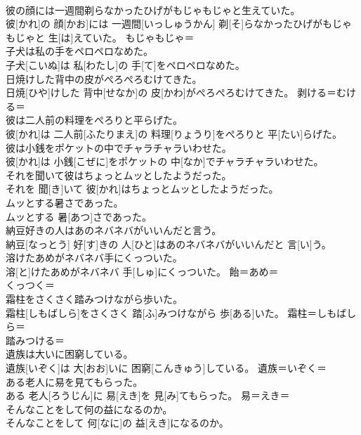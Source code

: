 \documentclass[8pt]{extreport}
\begin{document}
\begin{CJK}{UTF8}{min}
\\	彼の顔には一週間剃らなかったひげがもじゃもじゃと生えていた。	
\\	彼[かれ]の 顔[かお]には 一週間[いっしゅうかん] 剃[そ]らなかったひげがもじゃもじゃと 生[は]えていた。	もじゃもじゃ＝ 
\\	子犬は私の手をペロペロなめた。	
\\	子犬[こいぬ]は 私[わたし]の 手[て]をペロペロなめた。	
\\	日焼けした背中の皮がぺろぺろむけてきた。	
\\	日焼[ひや]けした 背中[せなか]の 皮[かわ]がぺろぺろむけてきた。	剥ける＝むける＝ 
\\	彼は二人前の料理をぺろりと平らげた。	
\\	彼[かれ]は 二人前[ふたりまえ]の 料理[りょうり]をぺろりと 平[たい]らげた。	
\\	彼は小銭をポケットの中でチャラチャラいわせた。	
\\	彼[かれ]は 小銭[こぜに]をポケットの 中[なか]でチャラチャラいわせた。	
\\	それを聞いて彼はちょっとムッとしたようだった。	
\\	それを 聞[き]いて 彼[かれ]はちょっとムッとしたようだった。	
\\	ムッとする暑さであった。	
\\	ムッとする 暑[あつ]さであった。	
\\	納豆好きの人はあのネバネバがいいんだと言う。	
\\	納豆[なっとう] 好[す]きの 人[ひと]はあのネバネバがいいんだと 言[い]う。	
\\	溶けたあめがネバネバ手にくっついた。	
\\	溶[と]けたあめがネバネバ 手[しゅ]にくっついた。	飴＝あめ＝ 
\\	くっつく＝
\\	霜柱をさくさく踏みつけながら歩いた。	
\\	霜柱[しもばしら]をさくさく 踏[ふ]みつけながら 歩[ある]いた。	霜柱＝しもばしら＝ 
\\	踏みつける＝ 
\\	遺族は大いに困窮している。	
\\	遺族[いぞく]は 大[おお]いに 困窮[こんきゅう]している。	遺族＝いぞく＝ 
\\	ある老人に易を見てもらった。	
\\	ある 老人[ろうじん]に 易[えき]を 見[み]てもらった。	易＝えき＝ 
\\	そんなことをして何の益になるのか。	
\\	そんなことをして 何[なに]の 益[えき]になるのか。	

\end{CJK}
\end{document}
